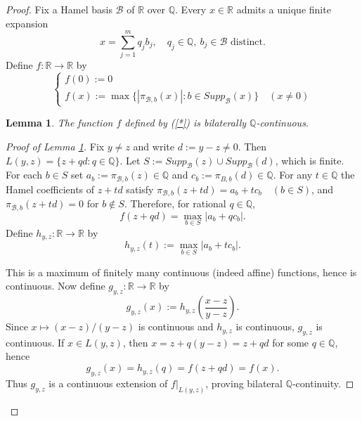\documentclass[11pt]{amsart} %
\newtheorem{lemma}[theorem]{Lemma}
\theoremstyle{definition}
\newcommand{\B}{\mathcal{B}}
\begin{document}
\begin{proof}
Fix a Hamel basis $\B$ of $\mathbb{R}$ over $\mathbb{Q}$. Every $x\in\mathbb{R}$ admits a unique finite expansion
\begin{equation} 
x=\sum_{j=1}^{m}q_{j}b_{j}, \quad q_{j}\in\mathbb{Q}, \ b_{j}\in \B \text{ distinct.} 
\label{ham:exp}
\end{equation} 
Define $f:\mathbb{R}\rightarrow\mathbb{R}$ by
\begin{equation}\label{*}
\begin{cases}
f(0):=0 \\
f(x):=\max\{|\pi_{\B,b}(x)|:b\in Supp_{\B}(x)\} \quad (x\ne0)
\end{cases}
\end{equation}

\begin{lemma}
\label{lem:5.8}
The function $f$ defined by (\ref{*}) is bilaterally $\mathbb{Q}$-continuous. %
\end{lemma}

\begin{proof}[Proof of Lemma \ref{lem:5.8}]
Fix $y\ne z$ and write $d:=y-z\ne0$. Then $L(y,z)=\{z+qd:q\in\mathbb{Q}\}$. Let $S:=Supp_{\B}(z)\cup Supp_{\B}(d)$, which is finite. For each $b\in S$ set $a_{b}:=\pi_{\B,b}(z)\in\mathbb{Q}$ and $c_{b}:=\pi_{B,b}(d)\in\mathbb{Q}$. For any $t\in\mathbb{Q}$ the Hamel coefficients of $z+td$ satisfy $\pi_{\B,b}(z+td)=a_{b}+tc_{b} \quad (b\in S)$, 
and $\pi_{\B,b}(z+td)=0$ for $b\notin S$. Therefore, for rational $q\in\mathbb{Q}$,
\begin{equation} 
f(z+qd)=\max_{b\in S}|a_{b}+qc_{b}|. \end{equation} 
Define $h_{y,z}:\mathbb{R}\rightarrow\mathbb{R}$ by
\begin{equation} 
h_{y,z}(t):=\max_{b\in S}|a_{b}+tc_{b}|. 
\end{equation} 

This is a maximum of finitely many continuous (indeed affine) functions, hence is continuous. Now define $g_{y,z}:\mathbb{R}\rightarrow\mathbb{R}$ by
\begin{equation} 
g_{y,z}(x):=h_{y,z}\left(\frac{x-z}{y-z}\right). 
\end{equation} 
Since $x\mapsto(x-z)/(y-z)$ is continuous and $h_{y,z}$ is continuous, $g_{y,z}$ is continuous. If $x\in L(y,z)$, then $x=z+q(y-z)=z+qd$ for some $q\in\mathbb{Q}$, hence
\begin{equation} 
g_{y,z}(x)=h_{y,z}(q)=f(z+qd)=f(x). 
\end{equation} 
Thus $g_{y,z}$ is a continuous extension of $f|_{L(y,z)}$, proving bilateral $\mathbb{Q}$-continuity.
\end{proof}



\end{proof}
\end{document}
